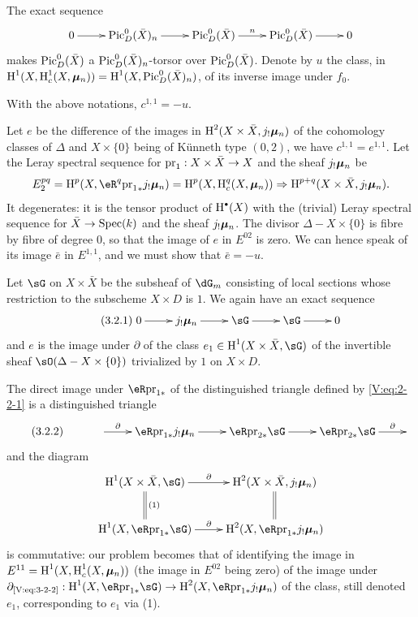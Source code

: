 The exact sequence
\[\xymatrix{
  0 \ar[r]
    & \pic_D^0(\bar X)_n \ar[r]
    & \pic_D^0(\bar X) \ar[r]^n
    & \pic_D^0(\bar X) \ar[r]
    & 0
}\]
makes $\operatorname{Pic}_D^0(\bar X)$ a $\operatorname{Pic}_D^0(\bar X)_n$-torsor over
$\operatorname{Pic}_D^0(\bar X)$. Denote by $u$ the class, in
$\operatorname{H}^1(X,\operatorname{H}_c^1(X,{\bm\mu}_n))=\operatorname{H}^1(X,\operatorname{Pic}_D^0(\bar X)_n)$, of its inverse
image under $f_0$.




\begin{proposition_}\label{V:3-2}
With the above notations, $c^{1,1}=-u$.
\end{proposition_}

Let $e$ be the difference of the images in $\operatorname{H}^2(X\times \bar X,j_!{\bm\mu}_n)$ of the
cohomology classes of $\Delta$ and $X\times\{0\}$ being of K\"unneth
type $(0,2)$, we have $c^{1,1}=e^{1,1}$. Let the Leray spectral sequence
for $\mathrm{pr}_1:X\times \bar X\to X$ and the sheaf $j_!{\bm\mu}_n$ be
\[
  E_2^{pq} = \h^p(X,\eR^q {\pr_1}_\ast j_!\dmu_n) = \h^p(X,\h_c^q(X,\dmu_n)) \Rightarrow \h^{p+q}(X\times \bar X,j_!\dmu_n) \text{.}
\]
It degenerates: it is the tensor product of $\h^\bullet(X)$ with the
(trivial) Leray spectral sequence for $\bar X\to \operatorname{Spec}(k)$ and the sheaf
$j_!{\bm\mu}_n$. The divisor $\Delta-X\times\{0\}$ is fibre by fibre of degree
$0$, so that the image of $e$ in $E^{02}$ is zero. We can hence speak
of its image $\bar e$ in $E^{1,1}$, and we must show that
$\bar e = -u$.

Let $\sG$ on $X\times\bar X$ be the subsheaf of $\dG_m$ consisting of local
sections whose restriction to the subscheme $X\times D$ is $1$. We again have
an exact sequence
\begin{equation*}\tag{3.2.1}\label{V:eq:3-2-1}
\xymatrix{
  0 \ar[r]
    & j_!\dmu_n \ar[r]
    & \sG \ar[r]
    & \sG \ar[r]
    & 0
}
\end{equation*}
and $e$ is the image under $\partial$ of the class $e_1\in \h^1(X\times\bar X,\sG)$
of the invertible sheaf $\sO(\Delta-X\times\{0\})$ trivialized by $1$ on
$X\times D$.

The direct image under $\eR\pr_{1\ast}$ of the distinguished triangle defined by
\eqref{V:eq:2-2-1} is a distinguished triangle
\begin{equation*}\tag{3.2.2}\label{V:eq:3-2-2}
\xymatrix{
  & \ar[r]^-\partial
    & \eR \pr_{1\ast} j_!\dmu_n \ar[r]
    & \eR \pr_{2\ast}\sG \ar[r]
    & \eR \pr_{2\ast}\sG \ar[r]^-\partial
    &
}
\end{equation*}
and the diagram
\[\xymatrix{
  \h^1(X\times \bar X,\sG) \ar[r]^-\partial \ar@{=}[d]^-{(1)}
    & \h^2(X\times \bar X,j_!\dmu_n) \ar@{=}[d] \\
  \h^1(X,\eR\pr_{1\ast} \sG) \ar[r]^-\partial
    & \h^2(X,\eR\pr_{1\ast} j_!\dmu_n)
}\]
is commutative: our problem becomes that of identifying the image in
$E^{11}=\operatorname{H}^1(X,\operatorname{H}_c^1(X,{\bm\mu}_n))$ (the image in $E^{02}$ being zero) of
the image under
$\partial_{\text{\eqref{V:eq:3-2-2}}}:\h^1(X,\eR\pr_{1\ast}\sG) \to \h^2(X,\eR\pr_{1\ast} j_!\dmu_n)$
of the class, still denoted $e_1$, corresponding to $e_1$ via
(1).

